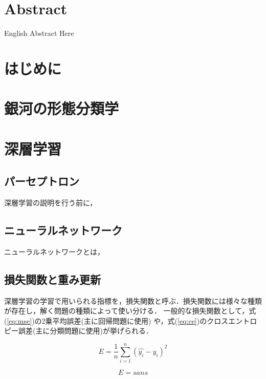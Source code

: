 \documentclass[a4j, 11pt]{jarticle}
\begin{document}
\section*{Abstract}
English Abstract Here


\newpage
\tableofcontents       %
\thispagestyle{empty}  %
\pagebreak
{} %


\section{はじめに}


\newpage
\section{銀河の形態分類学}

\newpage
\section{深層学習}
\subsection{パーセプトロン}
深層学習の説明を行う前に，

\subsection{ニューラルネットワーク}
ニューラルネットワークとは，

\newpage
\subsection{損失関数と重み更新}
深層学習の学習で用いられる指標を，損失関数と呼ぶ．損失関数には様々な種類が存在し，解く問題の種類によって使い分ける．
一般的な損失関数として，式(\ref{eq:mse})の2乗平均誤差(主に回帰問題に使用) や，式(\ref{eq:ce})のクロスエントロピー誤差(主に分類問題に使用)が挙げられる．

\begin{equation}
E = \frac{1}{n} \sum_{i=1}^{n} (\hat{y_i} - y_i)^2
\label{eq:mse}
\end{equation}

\begin{equation}
E = sans
\label{eq:ce}
\end{equation}
\end{document}
